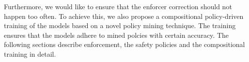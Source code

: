 Furthermore, we would like to ensure that the enforcer correction should not happen too often. To achieve this, we also propose a compositional policy-driven training of the models based on a novel policy mining technique. The training ensures that the models adhere to mined polcies with certain accuracy. The following sections describe enforcement, the safety policies and the compositional training in detail.



